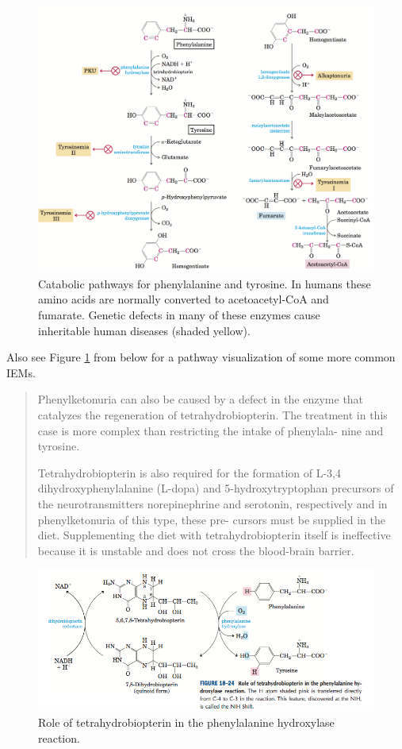 \documentclass{article}
\begin{document}
\begin{figure}[h!]
\includegraphics[width=\textwidth]{lehninger-IEMs}
\caption{Catabolic pathways for phenylalanine and tyrosine. In humans these amino acids are normally converted to acetoacetyl-CoA and fumarate. Genetic defects in many of these enzymes cause inheritable human diseases (shaded yellow).}
\label{fig:IEMs}
\end{figure}

Also see Figure \ref{fig:IEMs} from \cite{Lehninger_principlesBiochemistry} below for a pathway visualization of some more common IEMs.

\begin{quote}
Phenylketonuria can also be caused by a defect in the enzyme that catalyzes the regeneration of tetrahydrobiopterin. The treatment in this case is more complex than restricting the intake of phenylala- nine and tyrosine.

Tetrahydrobiopterin is also required for the formation of L-3,4 dihydroxyphenylalanine (L-dopa) and 5-hydroxytryptophan precursors of the neurotransmitters norepinephrine and serotonin, respectively and in phenylketonuria of this type, these pre- cursors must be supplied in the diet. Supplementing the diet with tetrahydrobiopterin itself is ineffective because it is unstable and does not cross the blood-brain barrier.
\end{quote}

\begin{figure}[h!]
\includegraphics[width=\textwidth]{biopterin_salvage}
\caption{Role of tetrahydrobiopterin in the phenylalanine hydroxylase reaction.}
\label{fig:biopterin_salvage}
\end{figure}
\end{document}
